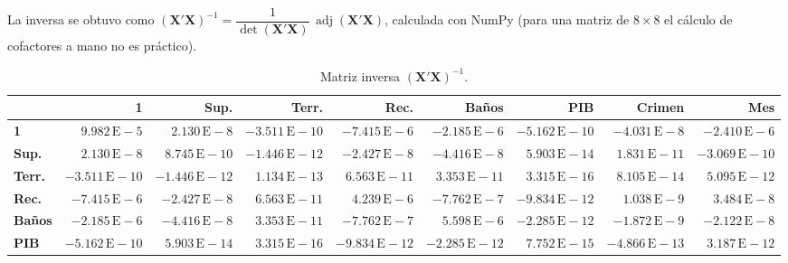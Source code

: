 \documentclass[12pt,letterpaper]{article}
\newcommand{\paren}[1]{\left(#1\right)}
\begin{document}
La inversa se obtuvo como $\paren{\mathbf{X}'\mathbf{X}}^{-1} = \dfrac{1}{\det\paren{\mathbf{X}'\mathbf{X}}}\,\operatorname{adj}\paren{\mathbf{X}'\mathbf{X}}$, calculada con NumPy (para una matriz de $8 \times 8$ el cálculo de cofactores a mano no es práctico).

\begin{table}[H]
\centering
\caption{Matriz inversa $\paren{\mathbf{X}'\mathbf{X}}^{-1}$.}
\scriptsize\setlength{\tabcolsep}{2.5pt}
\begin{tabular}{l*{8}{r}}
\toprule
 & 1 & Sup. & Terr. & Rec. & Baños & PIB & Crimen & Mes \\
\midrule
\textbf{1} & $9.982{\scriptstyle\,\mathrm{E}-5}$ & $2.130{\scriptstyle\,\mathrm{E}-8}$ & $-3.511{\scriptstyle\,\mathrm{E}-10}$ & $-7.415{\scriptstyle\,\mathrm{E}-6}$ & $-2.185{\scriptstyle\,\mathrm{E}-6}$ & $-5.162{\scriptstyle\,\mathrm{E}-10}$ & $-4.031{\scriptstyle\,\mathrm{E}-8}$ & $-2.410{\scriptstyle\,\mathrm{E}-6}$ \\
\textbf{Sup.} & $2.130{\scriptstyle\,\mathrm{E}-8}$ & $8.745{\scriptstyle\,\mathrm{E}-10}$ & $-1.446{\scriptstyle\,\mathrm{E}-12}$ & $-2.427{\scriptstyle\,\mathrm{E}-8}$ & $-4.416{\scriptstyle\,\mathrm{E}-8}$ & $5.903{\scriptstyle\,\mathrm{E}-14}$ & $1.831{\scriptstyle\,\mathrm{E}-11}$ & $-3.069{\scriptstyle\,\mathrm{E}-10}$ \\
\textbf{Terr.} & $-3.511{\scriptstyle\,\mathrm{E}-10}$ & $-1.446{\scriptstyle\,\mathrm{E}-12}$ & $1.134{\scriptstyle\,\mathrm{E}-13}$ & $6.563{\scriptstyle\,\mathrm{E}-11}$ & $3.353{\scriptstyle\,\mathrm{E}-11}$ & $3.315{\scriptstyle\,\mathrm{E}-16}$ & $8.105{\scriptstyle\,\mathrm{E}-14}$ & $5.095{\scriptstyle\,\mathrm{E}-12}$ \\
\textbf{Rec.} & $-7.415{\scriptstyle\,\mathrm{E}-6}$ & $-2.427{\scriptstyle\,\mathrm{E}-8}$ & $6.563{\scriptstyle\,\mathrm{E}-11}$ & $4.239{\scriptstyle\,\mathrm{E}-6}$ & $-7.762{\scriptstyle\,\mathrm{E}-7}$ & $-9.834{\scriptstyle\,\mathrm{E}-12}$ & $1.038{\scriptstyle\,\mathrm{E}-9}$ & $3.484{\scriptstyle\,\mathrm{E}-8}$ \\
\textbf{Baños} & $-2.185{\scriptstyle\,\mathrm{E}-6}$ & $-4.416{\scriptstyle\,\mathrm{E}-8}$ & $3.353{\scriptstyle\,\mathrm{E}-11}$ & $-7.762{\scriptstyle\,\mathrm{E}-7}$ & $5.598{\scriptstyle\,\mathrm{E}-6}$ & $-2.285{\scriptstyle\,\mathrm{E}-12}$ & $-1.872{\scriptstyle\,\mathrm{E}-9}$ & $-2.122{\scriptstyle\,\mathrm{E}-8}$ \\
\textbf{PIB} & $-5.162{\scriptstyle\,\mathrm{E}-10}$ & $5.903{\scriptstyle\,\mathrm{E}-14}$ & $3.315{\scriptstyle\,\mathrm{E}-16}$ & $-9.834{\scriptstyle\,\mathrm{E}-12}$ & $-2.285{\scriptstyle\,\mathrm{E}-12}$ & $7.752{\scriptstyle\,\mathrm{E}-15}$ & $-4.866{\scriptstyle\,\mathrm{E}-13}$ & $3.187{\scriptstyle\,\mathrm{E}-12}$ \\

\end{tabular}
\end{table}
\end{document}
